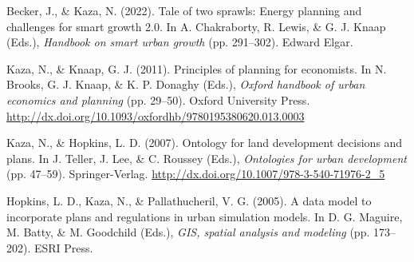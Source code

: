 \documentclass[11pt,a4paper,]{awesome-cv}
\newlength{\cslhangindent}
\newenvironment{CSLReferences}[2] %
 {\begin{list}{}{%
  \setlength{\itemindent}{0pt}
  \setlength{\leftmargin}{0pt}
  \setlength{\parsep}{0pt}
  \ifodd #1
   \setlength{\leftmargin}{\cslhangindent}
   \setlength{\itemindent}{-1\cslhangindent}
  \fi
  \setlength{\itemsep}{#2\baselineskip}}}
 {\end{list}}
\begin{document}
\label{refs-aaaf969735661a92bc15933de5718ba6}
\begin{CSLReferences}{1}{0}
Becker, J., \& Kaza, N. (2022). Tale of two sprawls: Energy planning and
challenges for smart growth 2.0. In A. Chakraborty, R. Lewis, \& G. J.
Knaap (Eds.), \emph{Handbook on smart urban growth} (pp. 291--302).
Edward Elgar.

Kaza, N., \& Knaap, G. J. (2011). Principles of planning for economists.
In N. Brooks, G. J. Knaap, \& K. P. Donaghy (Eds.), \emph{Oxford
handbook of urban economics and planning} (pp. 29--50). Oxford
University Press.
\url{http://dx.doi.org/10.1093/oxfordhb/9780195380620.013.0003}

Kaza, N., \& Hopkins, L. D. (2007). Ontology for land development
decisions and plans. In J. Teller, J. Lee, \& C. Roussey (Eds.),
\emph{Ontologies for urban development} (pp. 47--59). Springer-Verlag.
\url{http://dx.doi.org/10.1007/978-3-540-71976-2_5}

Hopkins, L. D., Kaza, N., \& Pallathucheril, V. G. (2005). A data model
to incorporate plans and regulations in urban simulation models. In D.
G. Maguire, M. Batty, \& M. Goodchild (Eds.), \emph{GIS, spatial
analysis and modeling} (pp. 173--202). ESRI Press.

\end{CSLReferences}


\label{LastPage}~
\end{document}
